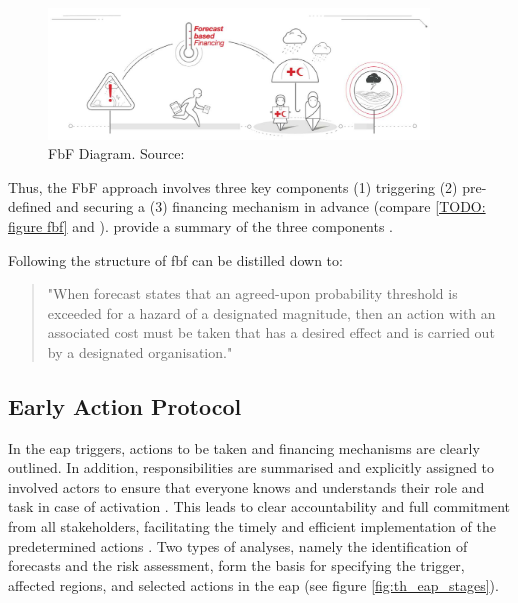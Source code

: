\begin{figure}[!htp]
    \centering
    \includegraphics[width=0.9\textwidth]{figures/2023_MA_th_fbf_diagram.jpg}
    \decoRule
    \caption[FbF Diagram]{FbF Diagram. Source: \autocite{rcrcFORECASTBASEDFINANCINGEARLY2020}}
    \label{fig:th_fbf_diagram}
\end{figure}

Thus, the FbF approach involves three key components (1) triggering (2) pre-defined  and securing a (3) financing mechanism in advance (compare \ref{TODO: figure fbf} and \autocite{ifrcForecastbasedFinancingNew2019}).  provide a summary of the three components \autocite{ruthForecastbasedFinancingPolicy2017}.

Following \autocite{coughlandeperezForecastbasedFinancingApproach2015, coughlandeperezActionbasedFloodForecasting2016} the structure of \acrshort{fbf} can be distilled down to:
\begin{quote}
    "When forecast states that an agreed-upon probability threshold is exceeded for a hazard of a designated magnitude, then an action with an associated cost must be taken that has a desired effect and is carried out by a designated organisation." \autocite[2]{coughlandeperezActionbasedFloodForecasting2016}
\end{quote}


\subsection{Early Action Protocol}\label{subsec:eap}

In the \acrfull{eap} triggers, actions to be taken and financing mechanisms are clearly outlined. In addition, responsibilities are summarised and explicitly assigned to involved actors to ensure that everyone knows and understands their role and task in case of activation \autocite{ruthForecastbasedFinancingPolicy2017}. This leads to clear accountability and full commitment from all stakeholders, facilitating the timely and efficient implementation of the predetermined actions \autocite{ruthForecastbasedFinancingPolicy2017}.\newline
Two types of analyses, namely the identification of forecasts and the risk assessment, form the basis for specifying the trigger, affected regions, and selected actions in the \acrshort{eap} (see figure \ref{fig:th_eap_stages}). 

